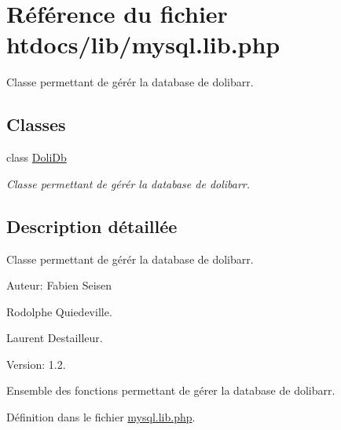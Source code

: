 \hypertarget{mysql_8lib_8php}{
\section{R\'{e}f\'{e}rence du fichier htdocs/lib/mysql.lib.php}
\label{mysql_8lib_8php}
}
Classe permettant de g\'{e}r\'{e}r la database de dolibarr.  


\subsection*{Classes}
\begin{CompactItemize}
\item 
class \hyperlink{classDoliDb}{Doli\-Db}
\begin{CompactList}\small\item\em Classe permettant de g\'{e}r\'{e}r la database de dolibarr. \item\end{CompactList}\end{CompactItemize}


\subsection{Description d\'{e}taill\'{e}e}
Classe permettant de g\'{e}r\'{e}r la database de dolibarr. 

\begin{Desc}
\item[Auteur:]Fabien Seisen 

Rodolphe Quiedeville. 

Laurent Destailleur. \end{Desc}
\begin{Desc}
\item[Version:]1.2.\end{Desc}
Ensemble des fonctions permettant de g\'{e}rer la database de dolibarr.

D\'{e}finition dans le fichier \hyperlink{mysql_8lib_8php-source}{mysql.lib.php}.